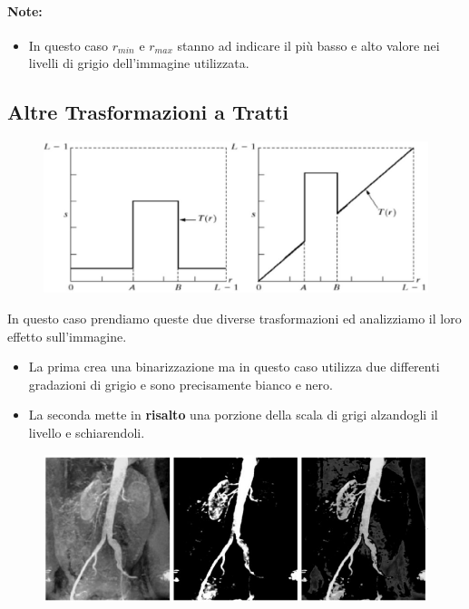 \paragraph{Note:}
\begin{itemize}
    \item In questo caso $r_{min}$ e $r_{max}$ stanno ad indicare il più basso e alto valore
          nei livelli di grigio dell'immagine utilizzata.
\end{itemize}

\subsection{Altre Trasformazioni a Tratti}

\begin{figure}[H]
    \centering
    \includegraphics[width=\linewidth, keepaspectratio]{capitoli/immagini/imgs/trasformazioni_lineari_esempio_7.jpg}
\end{figure}

In questo caso prendiamo queste due diverse trasformazioni ed analizziamo il
loro effetto sull'immagine.

\begin{itemize}
    \item La prima crea una binarizzazione ma in questo caso utilizza due
          differenti gradazioni di grigio e sono precisamente bianco e nero.
    \item La seconda mette in \textbf{risalto} una porzione della scala di grigi
          alzandogli il livello e schiarendoli.
\end{itemize}

\begin{figure}[H]
    \centering
    \includegraphics[width=\linewidth, keepaspectratio]{capitoli/immagini/imgs/angiografie_esempio_7.jpg}
\end{figure}

